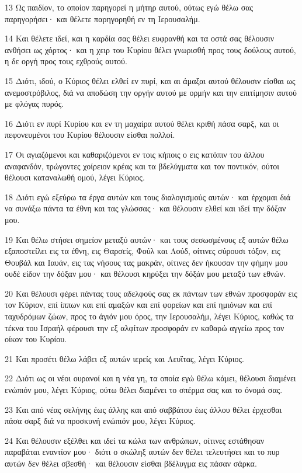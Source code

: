 \par 13 Ως παιδίον, το οποίον παρηγορεί η μήτηρ αυτού, ούτως εγώ θέλω σας παρηγορήσει· και θέλετε παρηγορηθή εν τη Ιερουσαλήμ.
\par 14 Και θέλετε ιδεί, και η καρδία σας θέλει ευφρανθή και τα οστά σας θέλουσιν ανθήσει ως χόρτος· και η χειρ του Κυρίου θέλει γνωρισθή προς τους δούλους αυτού, η δε οργή προς τους εχθρούς αυτού.
\par 15 Διότι, ιδού, ο Κύριος θέλει ελθεί εν πυρί, και αι άμαξαι αυτού θέλουσιν είσθαι ως ανεμοστρόβιλος, διά να αποδώση την οργήν αυτού με ορμήν και την επιτίμησιν αυτού με φλόγας πυρός.
\par 16 Διότι εν πυρί Κυρίου και εν τη μαχαίρα αυτού θέλει κριθή πάσα σαρξ, και οι πεφονευμένοι του Κυρίου θέλουσιν είσθαι πολλοί.
\par 17 Οι αγιαζόμενοι και καθαριζόμενοι εν τοις κήποις ο εις κατόπιν του άλλου αναφανδόν, τρώγοντες χοίρειον κρέας και τα βδελύγματα και τον ποντικόν, ούτοι θέλουσι καταναλωθή ομού, λέγει Κύριος.
\par 18 Διότι εγώ εξεύρω τα έργα αυτών και τους διαλογισμούς αυτών· και έρχομαι διά να συνάξω πάντα τα έθνη και τας γλώσσας· και θέλουσιν ελθεί και ιδεί την δόξαν μου.
\par 19 Και θέλω στήσει σημείον μεταξύ αυτών· και τους σεσωσμένους εξ αυτών θέλω εξαποστείλει εις τα έθνη, εις Θαρσείς, Φούλ και Λούδ, οίτινες σύρουσι τόξον, εις Θουβάλ και Ιαυάν, εις τας νήσους τας μακράν, οίτινες δεν ήκουσαν την φήμην μου ουδέ είδον την δόξαν μου· και θέλουσι κηρύξει την δόξάν μου μεταξύ των εθνών.
\par 20 Και θέλουσι φέρει πάντας τους αδελφούς σας εκ πάντων των εθνών προσφοράν εις τον Κύριον, επί ίππων και επί αμαξών και επί φορείων και επί ημιόνων και επί ταχυδρόμων ζώων, προς το άγιόν μου όρος, την Ιερουσαλήμ, λέγει Κύριος, καθώς τα τέκνα του Ισραήλ φέρουσι την εξ αλφίτων προσφοράν εν καθαρώ αγγείω προς τον οίκον του Κυρίου.
\par 21 Και προσέτι θέλω λάβει εξ αυτών ιερείς και Λευΐτας, λέγει Κύριος.
\par 22 Διότι ως οι νέοι ουρανοί και η νέα γη, τα οποία εγώ θέλω κάμει, θέλουσι διαμένει ενώπιόν μου, λέγει Κύριος, ούτω θέλει διαμένει το σπέρμα σας και το όνομά σας.
\par 23 Και από νέας σελήνης έως άλλης και από σαββάτου έως άλλου θέλει έρχεσθαι πάσα σαρξ διά να προσκυνή ενώπιόν μου, λέγει Κύριος.
\par 24 Και θέλουσιν εξέλθει και ιδεί τα κώλα των ανθρώπων, οίτινες εστάθησαν παραβάται εναντίον μου· διότι ο σκώληξ αυτών δεν θέλει τελευτήσει και το πυρ αυτών δεν θέλει σβεσθή· και θέλουσιν είσθαι βδέλυγμα εις πάσαν σάρκα.


